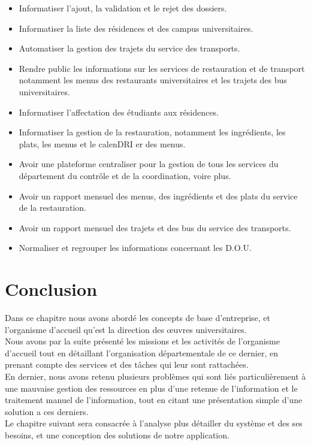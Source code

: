 \begin{itemize}
    \item Informatiser l'ajout, la validation et le rejet des dossiers.
    \item Informatiser la liste des résidences et des campus universitaires.
    \item Automatiser la gestion des trajets du service des transports.
    \item Rendre public les informations sur les services de restauration et de transport notamment les menus des restaurants universitaires et les trajets des bus universitaires. 
    \item Informatiser l'affectation des étudiants aux résidences.
    \item Informatiser la gestion de la restauration, notamment les ingrédients, les plats, les menus et le calen\acs{DRI} er des menus.
    \item Avoir une plateforme centraliser pour la gestion de tous les services du département du contrôle et de la coordination, voire plus.
    \item Avoir un rapport mensuel des menus, des ingrédients et des plats du service de la restauration.
    \item Avoir un rapport mensuel des trajets et des bus du service des transports.
    \item Normaliser et regrouper les informations concernant les \acs{D.O.U}.\\
\end{itemize}

\section{Conclusion}
Dans ce chapitre nous avons abordé les concepts de base d'entreprise, et l'organisme d'accueil qu'est la direction des œuvres universitaires.\\

Nous avons par la suite présenté les missions et les activités de l'organisme d'accueil tout en détaillant l'organisation départementale de ce dernier, en prenant compte des services et des tâches qui leur sont rattachées.\\

En dernier, nous avons retenu plusieurs problèmes qui sont liés particulièrement à une mauvaise gestion des ressources en plus d’une retenue de l’information et le traitement manuel de l'information, tout en citant une présentation simple d'une solution a ces derniers.\\

Le chapitre suivant sera consacrée à l'analyse plus détailler du système et des ses besoins, et une conception des solutions de notre application.